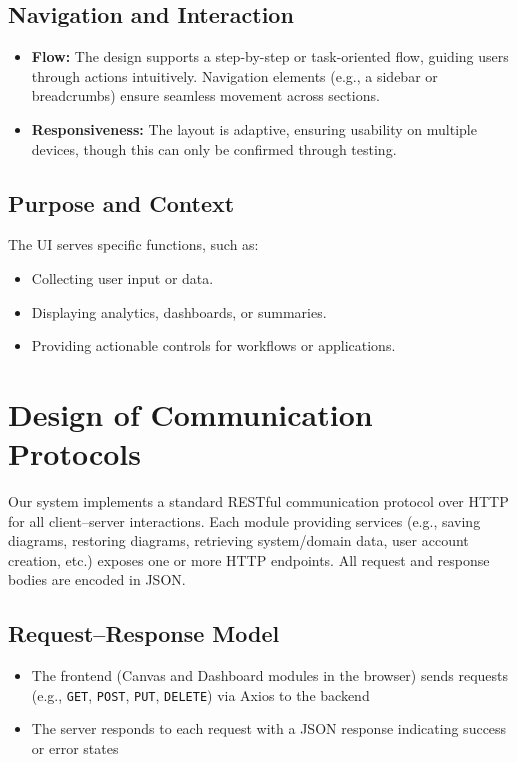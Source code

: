 \documentclass[12pt, titlepage]{article}
\begin{document}
\subsection*{Navigation and Interaction}
\begin{itemize}
    \item \textbf{Flow:} The design supports a step-by-step or task-oriented flow, guiding users through actions intuitively. Navigation elements (e.g., a sidebar or breadcrumbs) ensure seamless movement across sections.
    \item \textbf{Responsiveness:} The layout is adaptive, ensuring usability on multiple devices, though this can only be confirmed through testing.
\end{itemize}  

\subsection*{Purpose and Context}
The UI serves specific functions, such as:
\begin{itemize}
    \item Collecting user input or data.
    \item Displaying analytics, dashboards, or summaries.
    \item Providing actionable controls for workflows or applications.
\end{itemize}

\section{Design of Communication Protocols}

Our system implements a standard RESTful communication protocol over HTTP for all client--server interactions. Each module providing services (e.g., saving diagrams, restoring diagrams, retrieving system/domain data, user account creation, etc.) exposes one or more HTTP endpoints. All request and response bodies are encoded in JSON.

\subsection{Request--Response Model}

\begin{itemize}
    \item The frontend (Canvas and Dashboard modules in the browser) sends requests (e.g., \texttt{GET}, \texttt{POST}, \texttt{PUT}, \texttt{DELETE}) via Axios to the backend
    \item The server responds to each request with a JSON response indicating success or error states
\end{itemize}
\end{document}
